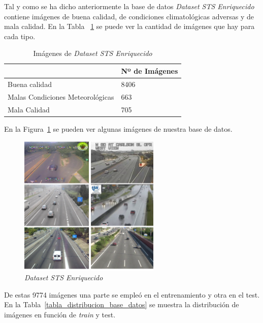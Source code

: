 Tal y como se ha dicho anteriormente la base de datos \textit{Dataset STS Enriquecido} contiene imágenes de buena calidad, de condiciones climatológicas adversas y de mala calidad. En la Tabla ~\ref{tabla_img_base_datos} se puede ver la cantidad de imágenes que hay para cada tipo.

\begin{table}[htb]
\begin{center}
\begin{tabular}{|l|l|}
\hline
\cline{2-2}& Nº de Imágenes\\
\hline \hline
Buena calidad & 8406 \\ \hline
Malas Condiciones Meteorológicas & 663\\ \hline
Mala Calidad & 705\\ \hline
\end{tabular}
\caption{Imágenes de \textit{Dataset STS Enriquecido}}
\label{tabla_img_base_datos}
\end{center}
\end{table}

En la Figura~\ref{fig.base_datos} se pueden ver algunas imágenes de nuestra base de datos.

\begin{figure}[H]
\begin{center}
	\includegraphics[width=0.6\textwidth]{figures/Diseno_global/base_datos.png}
   \caption{\textit{Dataset STS Enriquecido}}
	\label{fig.base_datos}
\end{center}
\end{figure}

De estas 9774 imágenes una parte se empleó en el entrenamiento y otra en el test. En la Tabla~\ref{tabla_distribucion_base_datos} se muestra la distribución de imágenes en función de \textit{train} y test.

